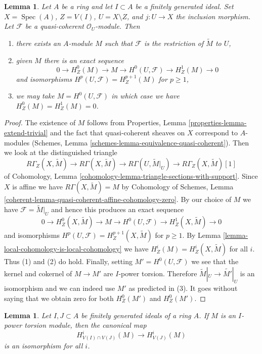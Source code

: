 \documentclass{stacks-project}
\theoremstyle{plain}
\newtheorem{lemma}[subsection]{Lemma}
\theoremstyle{definition}
\theoremstyle{remark}
\numberwithin{equation}{subsection}
\def\Spec{\mathop{\mathrm{Spec}}}
\begin{document}
\begin{lemma}
\label{lemma-local-cohomology}
Let $A$ be a ring and let $I \subset A$ be a finitely generated ideal.
Set $X = \Spec(A)$, $Z = V(I)$, $U = X \setminus Z$, and $j : U \to X$
the inclusion morphism. Let $\mathcal{F}$ be a quasi-coherent
$\mathcal{O}_U$-module. Then
\begin{enumerate}
\item there exists an $A$-module $M$ such that $\mathcal{F}$ is the
restriction of $\widetilde{M}$ to $U$,
\item given $M$ there is an exact sequence
$$
0 \to H^0_Z(M) \to M \to H^0(U, \mathcal{F}) \to H^1_Z(M) \to 0
$$
and isomorphisms $H^p(U, \mathcal{F}) = H^{p + 1}_Z(M)$ for $p \geq 1$,
\item we may take $M = H^0(U, \mathcal{F})$ in which case
we have $H^0_Z(M) = H^1_Z(M) = 0$.
\end{enumerate}
\end{lemma}

\begin{proof}
The existence of $M$ follows from
Properties, Lemma \ref{properties-lemma-extend-trivial}
and the fact that quasi-coherent sheaves on $X$ correspond
to $A$-modules (Schemes, Lemma \ref{schemes-lemma-equivalence-quasi-coherent}).
Then we look at the distinguished triangle
$$
R\Gamma_Z(X, \widetilde{M}) \to R\Gamma(X, \widetilde{M}) \to
R\Gamma(U, \widetilde{M}|_U) \to R\Gamma_Z(X, \widetilde{M})[1]
$$
of Cohomology, Lemma \ref{cohomology-lemma-triangle-sections-with-support}.
Since $X$ is affine we have $R\Gamma(X, \widetilde{M}) = M$
by Cohomology of Schemes, Lemma
\ref{coherent-lemma-quasi-coherent-affine-cohomology-zero}.
By our choice of $M$ we have $\mathcal{F} = \widetilde{M}|_U$
and hence this produces an exact sequence
$$
0 \to H^0_Z(X, \widetilde{M}) \to M \to H^0(U, \mathcal{F}) \to
H^1_Z(X, \widetilde{M}) \to 0
$$
and isomorphisms $H^p(U, \mathcal{F}) = H^{p + 1}_Z(X, \widetilde{M})$
for $p \geq 1$. By Lemma \ref{lemma-local-cohomology-is-local-cohomology}
we have $H^i_Z(M) = H^i_Z(X, \widetilde{M})$ for all $i$.
Thus (1) and (2) do hold.
Finally, setting $M' = H^0(U, \mathcal{F})$ we see that
the kernel and cokernel of $M \to M'$ are $I$-power torsion.
Therefore $\widetilde{M}|_U \to \widetilde{M'}|_U$ is an isomorphism
and we can indeed use $M'$ as predicted in (3). It goes without saying
that we obtain zero for both $H^0_Z(M')$ and $H^0_Z(M')$.
\end{proof}

\begin{lemma}
\label{lemma-already-torsion}
Let $I, J \subset A$ be finitely generated ideals of a ring $A$.
If $M$ is an $I$-power torsion module, then the
canonical map
$$
H^i_{V(I) \cap V(J)}(M) \to H^i_{V(J)}(M)
$$
is an isomorphism for all $i$.
\end{lemma}
\end{document}
